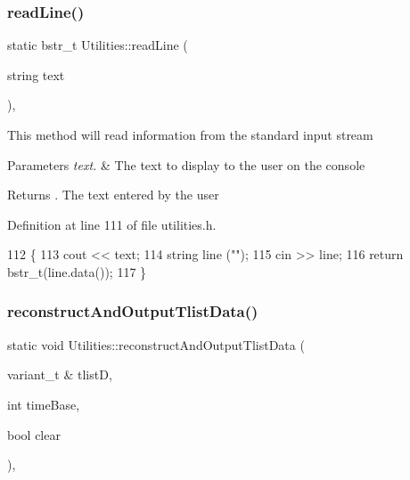 \subsubsection{\texorpdfstring{read\+Line()}{readLine()}}
{\footnotesize\ttfamily static bstr\+\_\+t Utilities\+::read\+Line (\begin{DoxyParamCaption}\item[{string}]{text }\end{DoxyParamCaption})\hspace{0.3cm}{\ttfamily [inline]}, {\ttfamily [static]}}

This method will read information from the standard input stream


\begin{DoxyParams}{Parameters}
{\em text.} & The text to display to the user on the console \\
\hline
\end{DoxyParams}
\begin{DoxyReturn}{Returns}
. The text entered by the user 
\end{DoxyReturn}


Definition at line 111 of file utilities.\+h.


\begin{DoxyCode}
112     \{
113         cout << text;
114         \textcolor{keywordtype}{string} line (\textcolor{stringliteral}{""});
115         cin >> line;
116         \textcolor{keywordflow}{return} bstr\_t(line.data());
117     \}
\end{DoxyCode}
\mbox{\label{class_utilities_a1026543ba8c95c142180ad642878671d_a1026543ba8c95c142180ad642878671d}} 
\subsubsection{\texorpdfstring{reconstruct\+And\+Output\+Tlist\+Data()}{reconstructAndOutputTlistData()}}
{\footnotesize\ttfamily static void Utilities\+::reconstruct\+And\+Output\+Tlist\+Data (\begin{DoxyParamCaption}\item[{variant\+\_\+t \&}]{tlistD,  }\item[{int}]{time\+Base,  }\item[{bool}]{clear }\end{DoxyParamCaption})\hspace{0.3cm}{\ttfamily [inline]}, {\ttfamily [static]}}

